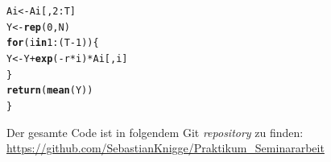 \documentclass[10pt,a4paper]{article}\usepackage[]{graphicx}\usepackage[]{color}
\makeatletter
\newcommand{\hlnum}[1]{\textcolor[rgb]{0.686,0.059,0.569}{#1}}%
\newcommand{\hlopt}[1]{\textcolor[rgb]{0,0,0}{#1}}%
\newcommand{\hlstd}[1]{\textcolor[rgb]{0.345,0.345,0.345}{#1}}%
\newcommand{\hlkwa}[1]{\textcolor[rgb]{0.161,0.373,0.58}{\textbf{#1}}}%
\newcommand{\hlkwb}[1]{\textcolor[rgb]{0.69,0.353,0.396}{#1}}%
\newcommand{\hlkwd}[1]{\textcolor[rgb]{0.737,0.353,0.396}{\textbf{#1}}}%
\newenvironment{kframe}{%
 \def\at@end@of@kframe{}%
 \ifinner\ifhmode%
  \def\at@end@of@kframe{\end{minipage}}%
  \begin{minipage}{\columnwidth}%
 \fi\fi%
 \def\FrameCommand##1{\hskip\@totalleftmargin \hskip-\fboxsep
 \colorbox{shadecolor}{##1}\hskip-\fboxsep
     \hskip-\linewidth \hskip-\@totalleftmargin \hskip\columnwidth}%
 \MakeFramed {\advance\hsize-\width
   \@totalleftmargin\z@ \linewidth\hsize
   \@setminipage}}%
 {\par\unskip\endMakeFramed%
 \at@end@of@kframe}
\makeatother
\begin{document}
\begin{kframe}
\begin{alltt}
  \hlstd{Ai} \hlkwb{<-} \hlstd{Ai[,}\hlnum{2}\hlopt{:}\hlstd{T]}
  \hlstd{Y} \hlkwb{<-} \hlkwd{rep}\hlstd{(}\hlnum{0}\hlstd{,N)}
  \hlkwa{for} \hlstd{(i} \hlkwa{in} \hlnum{1}\hlopt{:}\hlstd{(T}\hlopt{-}\hlnum{1}\hlstd{))\{}
    \hlstd{Y} \hlkwb{<-} \hlstd{Y}\hlopt{+}\hlkwd{exp}\hlstd{(}\hlopt{-}\hlstd{r}\hlopt{*}\hlstd{i)}\hlopt{*}\hlstd{Ai[,i]}
  \hlstd{\}}
  \hlkwd{return}\hlstd{(}\hlkwd{mean}\hlstd{(Y))}
\hlstd{\}}
\end{alltt}
\end{kframe}


Der gesamte Code ist in folgendem Git \textit{repository} zu finden:
\url{https://github.com/SebastianKnigge/Praktikum_Seminararbeit}
\end{document}
